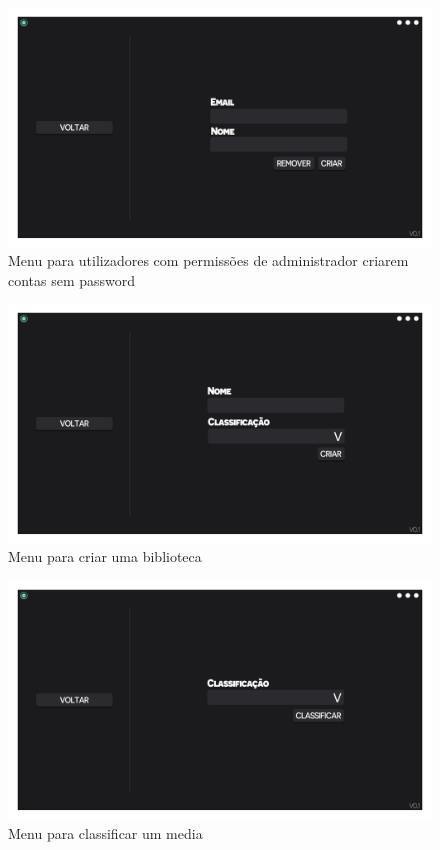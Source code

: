 \documentclass[a4paper]{report}
\begin{document}
\begin{figure}[H]
	\centering 
    \includegraphics[width=\textwidth]{images/CriarConta_Menu.png}  
    \caption{Menu para utilizadores com permissões de administrador criarem contas sem password}
\end{figure}

\begin{figure}[H]
	\centering 
    \includegraphics[width=\textwidth]{images/Criar_Biblioteca_Menu.png}  
    \caption{Menu para criar uma biblioteca}
\end{figure}

\begin{figure}[H]
	\centering 
    \includegraphics[width=\textwidth]{images/Classificar_Menu.png}  
    \caption{Menu para classificar um media}
\end{figure}
\end{document}
